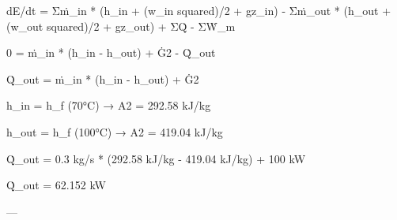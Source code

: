 dE/dt = Σṁ_in * (h_in + (w_in squared)/2 + gz_in) - Σṁ_out * (h_out + (w_out squared)/2 + gz_out) + ΣQ̇ - ΣẆ_m  

0 = ṁ_in * (h_in - h_out) + Ġ2 - Q̇_out  

Q̇_out = ṁ_in * (h_in - h_out) + Ġ2  

h_in = h_f (70°C) → A2  
= 292.58 kJ/kg  

h_out = h_f (100°C) → A2  
= 419.04 kJ/kg  

Q̇_out = 0.3 kg/s * (292.58 kJ/kg - 419.04 kJ/kg) + 100 kW  

Q̇_out = 62.152 kW  

---